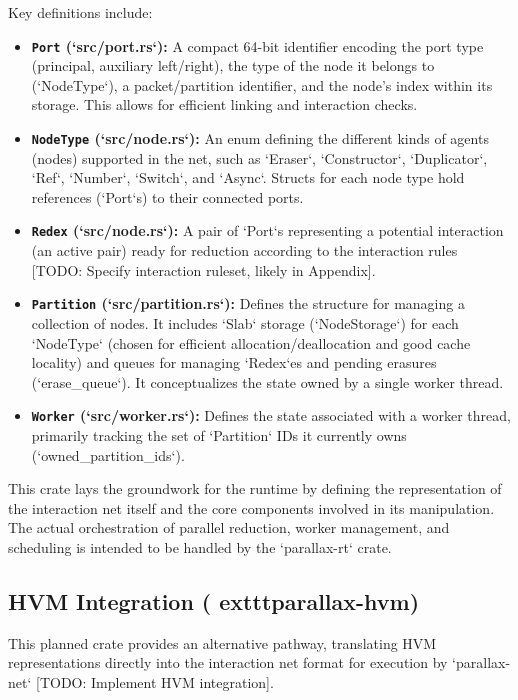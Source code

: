 Key definitions include:
\begin{itemize}
    \item \textbf{\texttt{Port} (`src/port.rs`):} A compact 64-bit identifier encoding the port type (principal, auxiliary left/right), the type of the node it belongs to (`NodeType`), a packet/partition identifier, and the node's index within its storage. This allows for efficient linking and interaction checks.
    \item \textbf{\texttt{NodeType} (`src/node.rs`):} An enum defining the different kinds of agents (nodes) supported in the net, such as `Eraser`, `Constructor`, `Duplicator`, `Ref`, `Number`, `Switch`, and `Async`. Structs for each node type hold references (`Port`s) to their connected ports.
    \item \textbf{\texttt{Redex} (`src/node.rs`):} A pair of `Port`s representing a potential interaction (an active pair) ready for reduction according to the interaction rules [TODO: Specify interaction ruleset, likely in Appendix].
    \item \textbf{\texttt{Partition} (`src/partition.rs`):} Defines the structure for managing a collection of nodes. It includes `Slab` storage (`NodeStorage`) for each `NodeType` (chosen for efficient allocation/deallocation and good cache locality) and queues for managing `Redex`es and pending erasures (`erase_queue`). It conceptualizes the state owned by a single worker thread.
    \item \textbf{\texttt{Worker} (`src/worker.rs`):} Defines the state associated with a worker thread, primarily tracking the set of `Partition` IDs it currently owns (`owned_partition_ids`).
\end{itemize}

This crate lays the groundwork for the runtime by defining the representation of the interaction net itself and the core components involved in its manipulation. The actual orchestration of parallel reduction, worker management, and scheduling is intended to be handled by the `parallax-rt` crate.

\subsection{HVM Integration (	exttt{parallax-hvm})} %
This planned crate provides an alternative pathway, translating HVM representations directly into the interaction net format for execution by `parallax-net` [TODO: Implement HVM integration].

